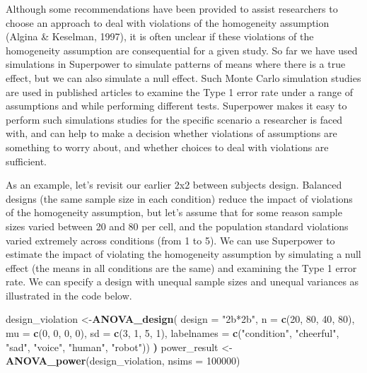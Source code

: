 \documentclass[
  ,jou,floatsintext]{apa6}
\newenvironment{Shaded}{\begin{snugshade}}{\end{snugshade}}
\newcommand{\DataTypeTok}[1]{\textcolor[rgb]{0.13,0.29,0.53}{#1}}
\newcommand{\DecValTok}[1]{\textcolor[rgb]{0.00,0.00,0.81}{#1}}
\newcommand{\ErrorTok}[1]{\textcolor[rgb]{0.64,0.00,0.00}{\textbf{#1}}}
\newcommand{\KeywordTok}[1]{\textcolor[rgb]{0.13,0.29,0.53}{\textbf{#1}}}
\newcommand{\NormalTok}[1]{#1}
\newcommand{\StringTok}[1]{\textcolor[rgb]{0.31,0.60,0.02}{#1}}
\begin{document}
Although some recommendations have been provided to assist researchers to choose an approach to deal with violations of the homogeneity assumption (Algina \& Keselman, 1997), it is often unclear if these violations of the homogeneity assumption are consequential for a given study.
So far we have used simulations in Superpower to simulate patterns of means where there is a true effect, but we can also simulate a null effect.
Such Monte Carlo simulation studies are used in published articles to examine the Type 1 error rate under a range of assumptions and while performing different tests.
Superpower makes it easy to perform such simulations studies for the specific scenario a researcher is faced with, and can help to make a decision whether violations of assumptions are something to worry about, and whether choices to deal with violations are sufficient.

As an example, let's revisit our earlier 2x2 between subjects design.
Balanced designs (the same sample size in each condition) reduce the impact of violations of the homogeneity assumption, but let's assume that for some reason sample sizes varied between 20 and 80 per cell, and the population standard violations varied extremely across conditions (from 1 to 5).
We can use Superpower to estimate the impact of violating the homogeneity assumption by simulating a null effect (the means in all conditions are the same) and examining the Type 1 error rate.
We can specify a design with unequal sample sizes and unequal variances as illustrated in the code below.

\begin{Shaded}
\begin{Highlighting}[]
\NormalTok{design_violation <-}\KeywordTok{ANOVA_design}\NormalTok{(}
 \DataTypeTok{design =} \StringTok{"2b*2b"}\NormalTok{, }\DataTypeTok{n =} \KeywordTok{c}\NormalTok{(}\DecValTok{20}\NormalTok{, }\DecValTok{80}\NormalTok{, }\DecValTok{40}\NormalTok{, }\DecValTok{80}\NormalTok{), }
 \DataTypeTok{mu =} \KeywordTok{c}\NormalTok{(}\DecValTok{0}\NormalTok{, }\DecValTok{0}\NormalTok{, }\DecValTok{0}\NormalTok{, }\DecValTok{0}\NormalTok{), }\DataTypeTok{sd =} \KeywordTok{c}\NormalTok{(}\DecValTok{3}\NormalTok{, }\DecValTok{1}\NormalTok{, }\DecValTok{5}\NormalTok{, }\DecValTok{1}\NormalTok{),}
 \DataTypeTok{labelnames =} \KeywordTok{c}\NormalTok{(}\StringTok{"condition"}\NormalTok{, }\StringTok{"cheerful"}\NormalTok{, }\StringTok{"sad"}\NormalTok{,}
                \StringTok{"voice"}\NormalTok{, }\StringTok{"human"}\NormalTok{, }\StringTok{"robot"}\NormalTok{))}
\ErrorTok{)}
\NormalTok{power_result <-}\StringTok{ }\KeywordTok{ANOVA_power}\NormalTok{(design_violation, }
                            \DataTypeTok{nsims =} \DecValTok{100000}\NormalTok{)}
\end{Highlighting}
\end{Shaded}
\end{document}
